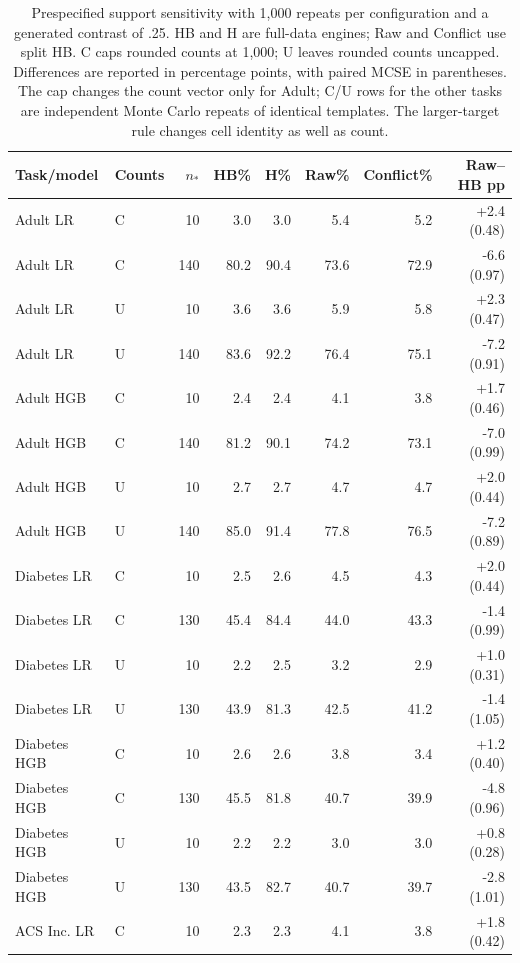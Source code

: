 \begin{table}[t]
\centering\small
\caption{Prespecified support sensitivity with 1,000 repeats per configuration and a generated contrast of .25. HB and H are full-data engines; Raw and Conflict use split HB. C caps rounded counts at 1,000; U leaves rounded counts uncapped. Differences are reported in percentage points, with paired MCSE in parentheses. The cap changes the count vector only for Adult; C/U rows for the other tasks are independent Monte Carlo repeats of identical templates. The larger-target rule changes cell identity as well as count.}\label{tab:support}
\begin{tabular}{llrrrrrr}
\toprule
Task/model & Counts & $n_*$ & HB\% & H\% & Raw\% & Conflict\% & Raw--HB pp \\
\midrule
Adult LR & C & 10 & 3.0 & 3.0 & 5.4 & 5.2 & +2.4 (0.48) \\
Adult LR & C & 140 & 80.2 & 90.4 & 73.6 & 72.9 & -6.6 (0.97) \\
Adult LR & U & 10 & 3.6 & 3.6 & 5.9 & 5.8 & +2.3 (0.47) \\
Adult LR & U & 140 & 83.6 & 92.2 & 76.4 & 75.1 & -7.2 (0.91) \\
Adult HGB & C & 10 & 2.4 & 2.4 & 4.1 & 3.8 & +1.7 (0.46) \\
Adult HGB & C & 140 & 81.2 & 90.1 & 74.2 & 73.1 & -7.0 (0.99) \\
Adult HGB & U & 10 & 2.7 & 2.7 & 4.7 & 4.7 & +2.0 (0.44) \\
Adult HGB & U & 140 & 85.0 & 91.4 & 77.8 & 76.5 & -7.2 (0.89) \\
Diabetes LR & C & 10 & 2.5 & 2.6 & 4.5 & 4.3 & +2.0 (0.44) \\
Diabetes LR & C & 130 & 45.4 & 84.4 & 44.0 & 43.3 & -1.4 (0.99) \\
Diabetes LR & U & 10 & 2.2 & 2.5 & 3.2 & 2.9 & +1.0 (0.31) \\
Diabetes LR & U & 130 & 43.9 & 81.3 & 42.5 & 41.2 & -1.4 (1.05) \\
Diabetes HGB & C & 10 & 2.6 & 2.6 & 3.8 & 3.4 & +1.2 (0.40) \\
Diabetes HGB & C & 130 & 45.5 & 81.8 & 40.7 & 39.9 & -4.8 (0.96) \\
Diabetes HGB & U & 10 & 2.2 & 2.2 & 3.0 & 3.0 & +0.8 (0.28) \\
Diabetes HGB & U & 130 & 43.5 & 82.7 & 40.7 & 39.7 & -2.8 (1.01) \\
ACS Inc. LR & C & 10 & 2.3 & 2.3 & 4.1 & 3.8 & +1.8 (0.42) \\

\end{tabular}
\end{table}
